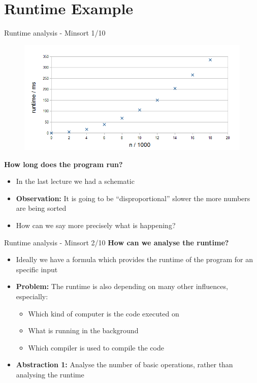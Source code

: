 \section{Runtime Example}



\begin{frame}{Runtime analysis - Minsort 1/10}
  \vspace{-1em}
  \begin{figure}[!h]
    \includegraphics[width=0.75\linewidth]{Images/MinSort/Minsort.png}
    \label{fig:introduction:minsort_runtime}
  \end{figure}
  \vspace{-0.5em}
  \textbf{How long does the program run?}
  \begin{itemize}
    \item
      In the last lecture we had a schematic
    \item
      \textbf{Observation:} It is going to be \enquote{disproportional} slower
      the more numbers are being sorted
    \item
      How can we say more precisely what is happening?
  \end{itemize}
\end{frame}


\begin{frame}{Runtime analysis - Minsort 2/10}
  \textbf{How can we analyse the runtime?}
  \begin{itemize}
    \item
      Ideally we have a formula which provides the runtime of the program for
      an specific input
    \item<2- |handout:1>
      \textbf{Problem:}
      The runtime is also depending on many other influences, especially:
      \begin{itemize}
        \item
          Which kind of computer is the code executed on
        \item What is running in the background
        \item Which compiler is used to compile the code
      \end{itemize}
    \item<3- |handout:1>
      \textbf{Abstraction 1:}
      Analyse the number of basic operations, rather than analysing the runtime
  \end{itemize}
\end{frame}